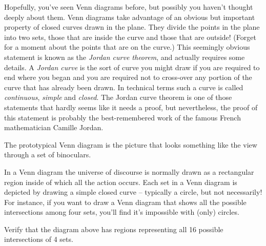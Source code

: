 Hopefully, you've seen 
Venn diagrams before, but possibly 
you haven't thought deeply about them. Venn diagrams take 
advantage of an obvious but important property of closed 
curves drawn in the plane.  They divide the points in the
plane into two sets, those that are inside the curve and
those that are outside!  (Forget for a moment about the points
that are on the curve.)  This seemingly obvious statement
is known as the 
\emph{Jordan curve theorem}, and actually
requires some details.  A 
\emph{Jordan curve} is the sort 
of curve you might draw if you are required to end where
you began and you are required not to cross-over any portion 
of the curve that has already been drawn.  In technical
terms such a curve is called \emph{continuous}, \emph{simple} 
and \emph{closed}.
The Jordan curve theorem is one of those statements that hardly
seems like it needs a proof, but nevertheless, the proof of this
statement is probably the best-remembered work of the famous
French mathematician Camille Jordan.

The prototypical Venn diagram is the picture that looks something
like the view through a set of binoculars.

\vspace{.1in}



\vspace{.1in}

In a Venn diagram the 
universe of discourse is normally drawn as
a rectangular region inside of which all the action occurs.  Each
set in a Venn diagram is depicted by drawing a simple closed curve -- 
typically a circle, but not necessarily!  For instance, if you
want to draw a Venn diagram that shows all the possible intersections
among four sets, you'll find it's impossible with (only) circles.

\vspace{.1in}



\vspace{.1in}

\begin{exer}
Verify that the diagram above has regions representing all 16 possible
intersections of 4 sets.
\end{exer}

